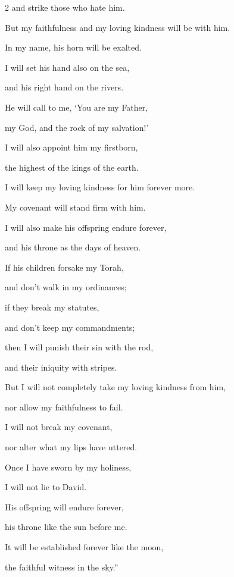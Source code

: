 \begin{multicols}{2}
	and strike those who hate him.
	
	
	\myverse{}But my faithfulness and my loving kindness will be with him.
	
	In my name, his horn will be exalted.
	
	
	\myverse{}I will set his hand also on the sea,
	
	and his right hand on the rivers.
	
	
	\myverse{}He will call to me, ‘You are my Father,
	
	my God, and the rock of my salvation!’
	
	
	\myverse{}I will also appoint him my firstborn,
	
	the highest of the kings of the earth.
	
	
	\myverse{}I will keep my loving kindness for him forever more.
	
	My covenant will stand firm with him.
	
	
	\myverse{}I will also make his offspring endure forever,
	
	and his throne as the days of heaven.
	
	
	\myverse{}If his children forsake my Torah,
	
	and don’t walk in my ordinances;
	
	
	\myverse{}if they break my statutes,
	
	and don’t keep my commandments;
	
	
	\myverse{}then I will punish their sin with the rod,
	
	and their iniquity with stripes.
	
	
	\myverse{}But I will not completely take my loving kindness from him,
	
	nor allow my faithfulness to fail.
	
	
	\myverse{}I will not break my covenant,
	
	nor alter what my lips have uttered.
	
	
	\myverse{}Once I have sworn by my holiness,
	
	I will not lie to David.
	
	
	\myverse{}His offspring will endure forever,
	
	his throne like the sun before me.
	
	
	\myverse{}It will be established forever like the moon,
	
	the faithful witness in the sky.”
	
	\vspace{\baselineskip}
	

\end{multicols}
